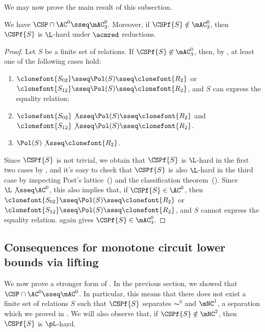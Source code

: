 \documentclass[11pt]{article}
\begin{document}
We may now prove the main result of this subsection.

\begin{theorem}
    \label{thm:ac0-csp}
    We have
    $\CSP \cap \AC^0 \sseq \mAC^0_3$.
    Moreover, if $\CSPf{S} \notin 
    \mAC^0_3$,
    then
    $\CSPf{S}$ is $\L$-hard under $\acmred$ reductions.
\end{theorem}
\begin{proof}
    Let $S$ be a finite set of relations.
    If
    $\CSPf{S} \not\in 
    \mAC^0_3$,
    then,
    by ,
    at least 
    one of the following cases hold:
    \begin{enumerate}
        \item $\clonefont{S_{02}} \sseq \Pol(S) \sseq \clonefont{R_2}$ 
            or 
            $\clonefont{S_{12}} \sseq \Pol(S) \sseq \clonefont{R_2}$,
            and $S$ can express the equality relation;
        \item 
            $\clonefont{S_{02}} \not\sseq \Pol(S) \sseq \clonefont{R_2}$
            and
            $\clonefont{S_{12}} \not \sseq \Pol(S) \sseq \clonefont{R_2}$.
        \item 
            $\Pol(S) \not\sseq \clonefont{R_2}$.
    \end{enumerate}
    Since $\CSPf{S}$ is not trivial,
    we obtain that $\CSPf{S}$ is $\L$-hard 
    in the first two cases
    by
    ,
    and it's easy to check that $\CSPf{S}$ is also
    $\L$-hard in the third case
    by 
    inspecting
    Post's 
    lattice~()
    and the classification theorem~().
    Since $\L \not\sseq \AC^0$,
    this also implies that, if $\CSPf{S} \in \AC^0$,
    then
    $\clonefont{S_{02}} \sseq \Pol(S) \sseq \clonefont{R_2}$
    or
    $\clonefont{S_{12}} \sseq \Pol(S) \sseq \clonefont{R_2}$,
    and $S$ cannot express the equality relation.
    again gives
    $\CSPf{S} \in \mAC^0_3$.
\end{proof}


\subsection{Consequences for monotone circuit lower bounds via lifting}
\label{sec:csp-conseq}

We now prove a stronger form of .
In the previous section, we showed that
$\CSP \cap \AC^0 \sseq \mAC^0$.
In particular, this means that there does not exist a finite set of relations $S$
such that
$\CSPf{S}$ separates $\AC^0$ and $\mNC^1$,
a separation which we proved in .
We will also observe that, if $\CSPf{S} \notin \mNC^2$, then $\CSPf{S}$ is
$\pL$-hard.
\end{document}
